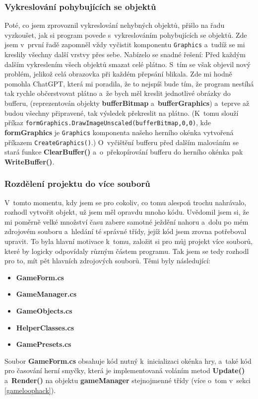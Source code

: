 \documentclass[a4]{article}
\begin{document}
\subsubsection{Vykreslování pohybujících se objektů} \label{buffering}
Poté, co jsem zprovoznil vykreslování nehybných objektů, přišlo na řadu vyzkoušet, jak si program povede s~vykreslováním pohybujících se objektů. Zde jsem v~první řadě zapomněl vždy vyčistit komponentu \verb|Graphics| a~tudíž se mi kreslily všechny další vrstvy přes sebe. Nabízelo se snadné řešení: Před každým dalším vykreslením všech objektů smazat celé plátno. S~tím se však objevil nový problém, jelikož celá obrazovka při každém přepsání blikala. Zde mi hodně pomohla ChatGPT, která mi poradila, že to nejspíš bude tím, že program nestíhá tak rychle občerstvovat plátno a~že bych měl kreslit jednotlivé obrázky do bufferu, (reprezentován objekty \textbf{bufferBitmap} a~\textbf{bufferGraphics}) a~teprve až budou všechny připravené, tak výsledek překreslit na plátno. (K~tomu slouží příkaz \verb|formGraphics.DrawImageUnscaled(bufferBitmap,0,0)|, kde \textbf{formGraphics} je \verb|Graphics| komponenta našeho herního okénka vytvořená příkazem \verb|CreateGraphics()|.) O~vyčištění bufferu před dalším malováním se stará funkce \textbf{ClearBuffer()} a~o~překopírování bufferu do herního okénka pak \textbf{WriteBuffer()}.

\subsubsection{Rozdělení projektu do více souborů}
V~tomto momentu, kdy jsem se pro cokoliv, co tomu alespoň trochu nahrávalo, rozhodl vytvořit objekt, už jsem měl opravdu mnoho kódu. Uvědomil jsem si, že mi poměrně velké množství času zabere samotné ježdění nahoru a~dolu po mém zdrojovém souboru a~hledání té správné třídy, jejíž kód jsem zrovna potřeboval upravit. To byla hlavní motivace k~tomu, založit si pro můj projekt více souborů, které by logicky odpovídaly různým částem programu. Tak jsem se tedy rozhodl pro to, mít pět hlavních zdrojových souborů. Těmi byly následující:
\begin{itemize}
    \item \textbf{GameForm.cs}
    \item \textbf{GameManager.cs}
    \item \textbf{GameObjects.cs}
    \item \textbf{HelperClasses.cs}
    \item \textbf{GamePresets.cs}
\end{itemize}
Soubor \textbf{GameForm.cs} obsahuje kód nutný k~inicializaci okénka hry, a~také kód pro časování herní smyčky, která je implementovaná voláním metod \textbf{Update()} a~\textbf{Render()} na objektu \textbf{gameManager} stejnojmenné třídy (více o~tom v~sekci \ref{gameloophack}). 
\end{document}
